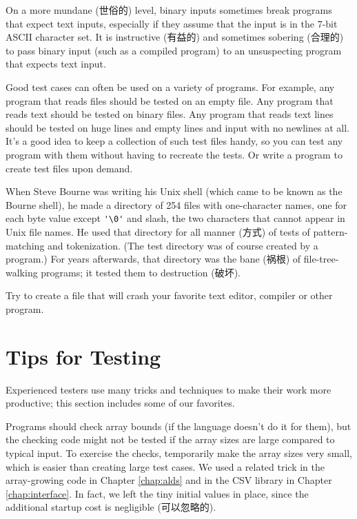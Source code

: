On a more mundane (世俗的) level, binary inputs sometimes break programs
that expect text inputs, especially if they assume that the input is in the
7-bit ASCII character set.  It is instructive (有益的) and sometimes
sobering (合理的) to pass binary input (such as a compiled program) to an
unsuspecting program that expects text input.

Good test cases can often be used on a variety of programs. For example,
any program that reads files should be tested on an empty file. Any program
that reads text should be tested on binary files. Any program that reads
text lines should be tested on huge lines and empty lines and input with no
newlines at all. It's a good idea to keep a collection of such test files
handy, so you can test any program with them without having to recreate the
tests. Or write a program to create test files upon demand.

When Steve Bourne was writing his Unix shell (which came to be known as the
Bourne shell), he made a directory of 254 files with one-character names,
one for each byte value except \verb"'\0'" and slash, the two characters
that cannot appear in Unix file names. He used that directory for all
manner (方式) of tests of pattern-matching and tokenization. (The test
directory was of course created by a program.) For years afterwards, that
directory was the bane (祸根) of file-tree-walking programs; it tested them
to destruction (破坏).

\begin{exercise}
    Try to create a file that will crash your favorite text editor,
    compiler or other program.
\end{exercise}

\section{Tips for Testing}
\label{sec:tips_for_testing}

Experienced testers use many tricks and techniques to make their work more
productive; this section includes some of our favorites.

Programs should check array bounds (if the language doesn't do it for
them), but the checking code might not be tested if the array sizes are
large compared to typical input. To exercise the checks, temporarily make
the array sizes very small, which is easier than creating large test cases.
We used a related trick in the array-growing code in Chapter
\ref{chap:alds} and in the CSV library in Chapter \ref{chap:interface}. In
fact, we left the tiny initial values in place, since the additional
startup cost is negligible (可以忽略的).

